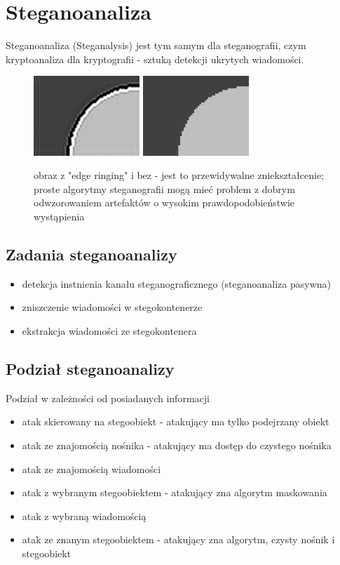 \documentclass{article}
\begin{document}
\section{Steganoanaliza}
Steganoanaliza (Steganalysis) jest tym samym dla steganografii, czym kryptoanaliza dla kryptografii - sztuką detekcji ukrytych wiadomości.
\begin{figure}[H]
	\centering
	\includegraphics[width=4cm]{edge_ringing}
	\includegraphics[width=4cm]{noringing}
	\caption{obraz z "edge ringing" i bez - jest to przewidywalne zniekształcenie; proste algorytmy steganografii mogą mieć problem z dobrym 
	odwzorowaniem artefaktów o wysokim prawdopodobieństwie wystąpienia}
\end{figure}
\subsection{Zadania steganoanalizy}
\begin{itemize}
	\item detekcja instnienia kanału steganograficznego (steganoanaliza pasywna)
	\item zniszczenie wiadomości w stegokontenerze
	\item ekstrakcja wiadomości ze stegokontenera
\end{itemize}
\subsection{Podział steganoanalizy}
Podział w zależności od posiadanych informacji
\begin{itemize}
	\item atak skierowany na stegoobiekt  - atakujący ma tylko podejrzany obiekt
	\item atak ze znajomością nośnika - atakujący ma dostęp do czystego nośnika
	\item atak ze znajomością wiadomości
	\item atak z wybranym stegoobiektem - atakujący zna algorytm maskowania
	\item atak z wybraną wiadomością
	\item atak ze znanym stegoobiektem - atakujący zna algorytm, czysty nośnik i stegoobiekt
\end{itemize}
\end{document}
